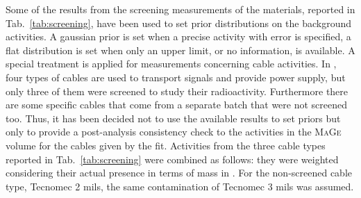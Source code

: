 Some of the results from the screening measurements of the materials, reported in Tab.~\ref{tab:screening}, have been used to set prior distributions on the background activities. A gaussian prior is set when a precise activity with error is specified, a flat distribution is set when only an upper limit, or no information, is available. A special treatment is applied for measurements concerning cable activities. In {\gerda}, four types of cables are used to transport signals and provide power supply, but only three of them were screened to study their radioactivity. Furthermore there are some specific cables that come from a separate batch that were not screened too. Thus, it has been decided not to use the available results to set priors but only to provide a post-analysis consistency check to the activities in the \textsc{MaGe} volume for the cables given by the fit. Activities from the three cable types reported in Tab.~\ref{tab:screening} were combined as follows: they were weighted considering their actual presence in terms of mass in {\gerda}. For the non-screened cable type, Tecnomec 2 mils, the same contamination of Tecnomec 3 mils was assumed.


